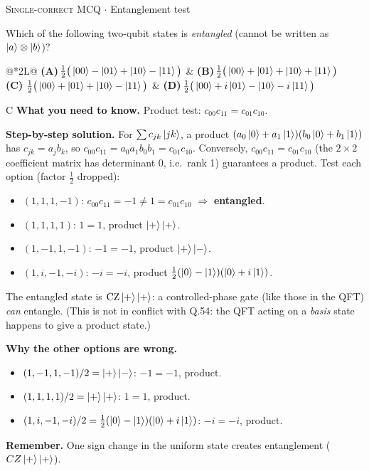 \documentclass[11pt,a4paper]{article}
\newcommand{\optlabel}[1]{\textbf{(#1)}}
\newcommand{\correctlabel}[1]{\textcolor{okgreen}{\textbf{(#1)}\,\ding{51}}}
\newenvironment{qitem}[1]{\begin{list}{}{\setlength{\leftmargin}{3.3em}\setlength{\labelwidth}{3.1em}%
  \setlength{\labelsep}{0.2em}\setlength{\topsep}{3pt}\setlength{\parsep}{3pt}}\item[\textbf{Q.#1}\hfill]}{\end{list}}
\newcommand{\qsep}{\par\vspace{2pt}{\color{black!15}\hrule}\vspace{4pt}}
\newcommand{\qmeta}[2]{{\footnotesize\color{black!60}\textsc{#1} \;$\cdot$\; #2}\par}
\begin{document}
\begin{qitem}{25}
\qmeta{Single-correct MCQ}{Entanglement test}
Which of the following two-qubit states is \emph{entangled} (cannot be written as $\ket{a}\otimes\ket{b}$)?
\par\smallskip\noindent\begin{tabularx}{\linewidth}{@{}*{2}{L}@{}}
\optlabel{A}\,$\frac12\big(\ket{00} - \ket{01} + \ket{10} - \ket{11}\big)$ & \optlabel{B}\,$\frac12\big(\ket{00} + \ket{01} + \ket{10} + \ket{11}\big)$ \\[3pt]
\correctlabel{C}\,$\frac12\big(\ket{00} + \ket{01} + \ket{10} - \ket{11}\big)$ & \optlabel{D}\,$\frac12\big(\ket{00} + i\ket{01} - \ket{10} - i\ket{11}\big)$
\end{tabularx}
\end{qitem}
\begin{solbox}{C}
\textbf{\color{brand}What you need to know.} Product test: $c_{00}c_{11} = c_{01}c_{10}$.

\textbf{\color{brand}Step-by-step solution.} For $\sum c_{jk}\ket{jk}$, a product $(a_0\ket0 + a_1\ket1)(b_0\ket0 + b_1\ket1)$ has $c_{jk} = a_jb_k$, so
$c_{00}c_{11} = a_0a_1b_0b_1 = c_{01}c_{10}$. Conversely, $c_{00}c_{11} = c_{01}c_{10}$ (the $2\times2$ coefficient matrix has
determinant 0, i.e.\ rank 1) guarantees a product. Test each option (factor $\frac12$ dropped):
\begin{itemize}\itemsep0pt
\item $(1, 1, 1, -1)$: $c_{00}c_{11} = -1 \neq 1 = c_{01}c_{10}$ $\Rightarrow$ \textbf{entangled}.
\item $(1, 1, 1, 1)$: $1 = 1$, product $\ket{+}\ket{+}$.
\item $(1, -1, 1, -1)$: $-1 = -1$, product $\ket{+}\ket{-}$.
\item $(1, i, -1, -i)$: $-i = -i$, product $\frac{1}{2}(\ket0 - \ket1)(\ket0 + i\ket1)$.
\end{itemize}
The entangled state is $\mathrm{CZ}\ket{+}\ket{+}$: a controlled-phase gate (like those in the QFT) \emph{can} entangle.
(This is not in conflict with Q.54: the QFT acting on a \emph{basis} state happens to give a product state.)

\textbf{\color{brand}Why the other options are wrong.}
\begin{itemize}[leftmargin=2.4em, itemsep=1pt, topsep=2pt]
\item[\textbf{(A)}] $(1,-1,1,-1)/2 = \ket+\ket-$: $-1 = -1$, product.
\item[\textbf{(B)}] $(1,1,1,1)/2 = \ket+\ket+$: $1 = 1$, product.
\item[\textbf{(D)}] $(1,i,-1,-i)/2 = \frac12(\ket0-\ket1)(\ket0+i\ket1)$: $-i = -i$, product.
\end{itemize}
\textbf{\color{brand}Remember.} One sign change in the uniform state creates entanglement ($CZ\ket+\ket+$).
\end{solbox}
\qsep
\end{document}
